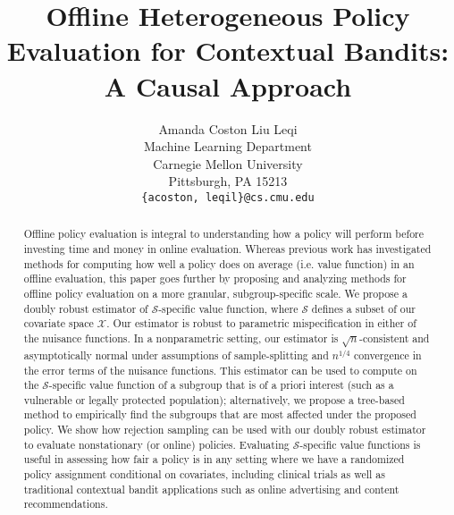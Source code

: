 \documentclass{article}
\title{%
Offline Heterogeneous Policy Evaluation for Contextual Bandits: A Causal Approach}
\author{
  Amanda Coston \quad Liu Leqi\\
  Machine Learning Department\\
  Carnegie Mellon University\\
  Pittsburgh, PA 15213 \\
  \texttt{\{acoston, leqil\}@cs.cmu.edu} \\
}
\begin{document}
\maketitle
\begin{abstract}
    Offline policy evaluation is integral to understanding how a policy will perform before investing time and money in online evaluation. Whereas previous work has investigated methods for computing how well a policy does on average (i.e. value function) in an offline evaluation, this paper goes further by proposing and analyzing methods for offline policy evaluation on a more granular, subgroup-specific scale. We propose a doubly robust estimator of $\mathcal{S}$-specific value function, where $\mathcal{S}$ defines a subset of our covariate space $\mathcal{X}$. Our estimator is robust to parametric mispecification in either of the nuisance functions. In a nonparametric setting, our estimator is $\sqrt{n}$-consistent and asymptotically normal under assumptions of sample-splitting and $n^{1/4}$ convergence in the error terms of the nuisance functions. This estimator can be used to compute on the $\mathcal{S}$-specific value function of a subgroup that is of a priori interest (such as a vulnerable or legally protected population); alternatively, we propose a tree-based method to empirically find the subgroups that are most affected under the proposed policy. We show how rejection sampling can be used with our doubly robust estimator to evaluate nonstationary (or online) policies. Evaluating $\mathcal{S}$-specific value functions is useful in assessing how fair a policy is in any setting where we have a randomized policy assignment conditional on covariates, including clinical trials as well as traditional contextual bandit applications such as online advertising and content recommendations.
\end{abstract}


%



 


\end{document}
